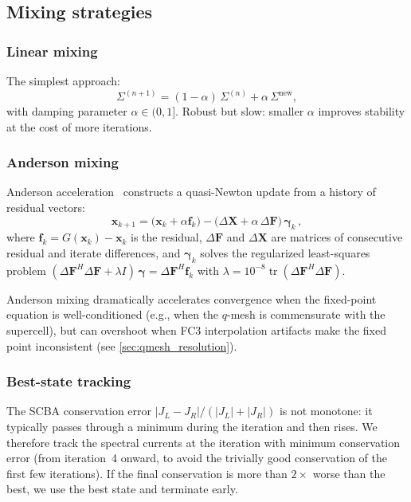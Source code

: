 \documentclass[11pt]{article}
\newcommand{\vc}[1]{\bm{#1}}
\DeclareMathOperator{\tr}{tr}
\begin{document}
\subsection{Mixing strategies}
\label{sec:mixing}

\subsubsection{Linear mixing}

The simplest approach:
\begin{equation}
  \Sigma^{(n+1)} = (1-\alpha)\,\Sigma^{(n)} + \alpha\,\Sigma^\mathrm{new},
\end{equation}
with damping parameter $\alpha \in (0, 1]$.  Robust but slow: smaller
$\alpha$ improves stability at the cost of more iterations.

\subsubsection{Anderson mixing}

Anderson acceleration~\cite{anderson1965} constructs a quasi-Newton
update from a history of residual vectors:
\begin{equation}\label{eq:anderson}
  \vc{x}_{k+1}
  = \bigl(\vc{x}_k + \alpha \vc{f}_k\bigr)
    - \bigl(\Delta\vc{X} + \alpha\,\Delta\vc{F}\bigr)\,\vc{\gamma}_k\,,
\end{equation}
where $\vc{f}_k = G(\vc{x}_k) - \vc{x}_k$ is the residual,
$\Delta\vc{F}$ and $\Delta\vc{X}$ are matrices of consecutive
residual and iterate differences, and $\vc{\gamma}_k$ solves the
regularized least-squares problem
$(\Delta\vc{F}^H \Delta\vc{F} + \lambda I)\,\vc{\gamma}
 = \Delta\vc{F}^H \vc{f}_k$
with $\lambda = 10^{-8} \tr(\Delta\vc{F}^H \Delta\vc{F})$.

Anderson mixing dramatically accelerates convergence when the
fixed-point equation is well-conditioned (e.g., when the $q$-mesh is
commensurate with the supercell), but can overshoot when FC3
interpolation artifacts make the fixed point inconsistent (see
\cref{sec:qmesh_resolution}).

\subsubsection{Best-state tracking}

The SCBA conservation error $|J_L - J_R| / (|J_L| + |J_R|)$ is not
monotone: it typically passes through a minimum during the iteration
and then rises.  We therefore track the spectral currents at the
iteration with minimum conservation error (from iteration~4 onward,
to avoid the trivially good conservation of the first few iterations).
If the final conservation is more than $2\times$ worse than the best,
we use the best state and terminate early.
\end{document}
